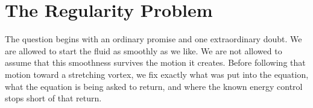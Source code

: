 \section{The Regularity Problem}\label{sec:TheRegularityProblem}

The question begins with an ordinary promise and one extraordinary doubt.  We
are allowed to start the fluid as smoothly as we like.  We are not allowed to
assume that this smoothness survives the motion it creates.  Before following
that motion toward a stretching vortex, we fix exactly what was put into the
equation, what the equation is being asked to return, and where the known
energy control stops short of that return.

\begingroup
\renewcommand{\theequation}{\thesection.\arabic{equation}}
\renewcommand{\theHequation}{\thesection.\arabic{equation}}

\endgroup

